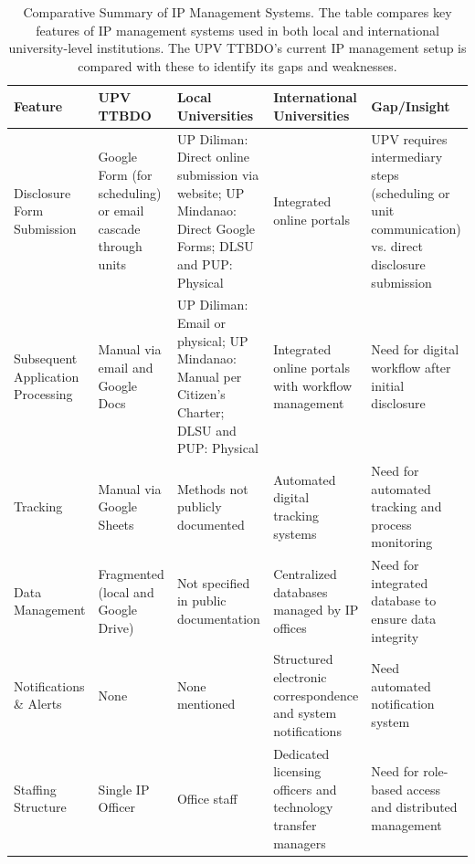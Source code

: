 \begin{landscape}
\begingroup
\setlength{\tabcolsep}{4pt}
\renewcommand{\arraystretch}{1.05}
\small
\begin{table}
\centering
\caption[Comparative Summary of IP Management Systems]{Comparative Summary of IP Management Systems. The table compares key features of IP management systems used in both local and international university-level institutions. The UPV TTBDO's current IP management setup is compared with these to identify its gaps and weaknesses.}
\label{tab:comparative}
\begin{tabularx}{\linewidth}{|X|X|X|X|X|}
\hline
\textbf{Feature} & \textbf{UPV TTBDO} & \textbf{Local Universities} & \textbf{International Universities} & \textbf{Gap/Insight} \\
\hline
Disclosure Form Submission
& Google Form (for scheduling) or email cascade through units
& UP Diliman: Direct online submission via website; UP Mindanao: Direct Google Forms; DLSU and PUP: Physical
& Integrated online portals
& UPV requires intermediary steps (scheduling or unit communication) vs. direct disclosure submission \\
\hline
Subsequent Application Processing
& Manual via email and Google Docs
& UP Diliman: Email or physical; UP Mindanao: Manual per Citizen's Charter; DLSU and PUP: Physical
& Integrated online portals with workflow management
& Need for digital workflow after initial disclosure \\
\hline
Tracking
& Manual via Google Sheets
& Methods not publicly documented
& Automated digital tracking systems
& Need for automated tracking and process monitoring \\
\hline
Data Management
& Fragmented (local and Google Drive)
& Not specified in public documentation
& Centralized databases managed by IP offices
& Need for integrated database to ensure data integrity \\
\hline
Notifications \& Alerts
& None
& None mentioned
& Structured electronic correspondence and system notifications
& Need automated notification system \\
\hline
Staffing Structure
& Single IP Officer
& Office staff
& Dedicated licensing officers and technology transfer managers
& Need for role-based access and distributed management \\
\hline
\end{tabularx}
\end{table}
\endgroup
\end{landscape}

